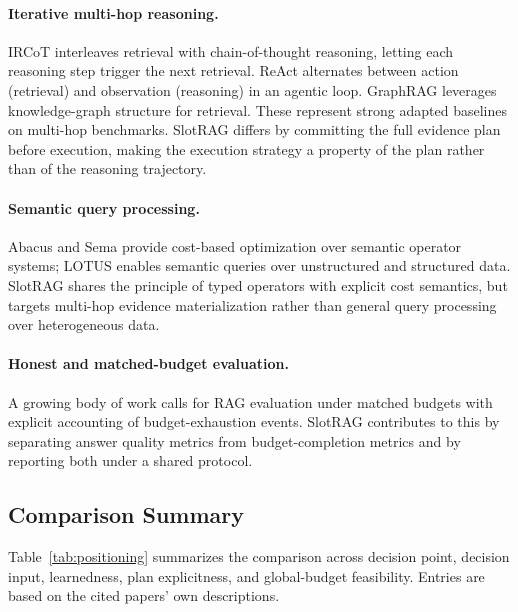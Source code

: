 \paragraph{Iterative multi-hop reasoning.}
IRCoT \cite{ircot} interleaves retrieval with chain-of-thought reasoning, letting each reasoning step trigger the next retrieval. ReAct \cite{react} alternates between action (retrieval) and observation (reasoning) in an agentic loop. GraphRAG \cite{graphrag} leverages knowledge-graph structure for retrieval. These represent strong adapted baselines on multi-hop benchmarks. SlotRAG differs by committing the full evidence plan before execution, making the execution strategy a property of the plan rather than of the reasoning trajectory.

\paragraph{Semantic query processing.}
Abacus and Sema \cite{sema} provide cost-based optimization over semantic operator systems; LOTUS \cite{lotus} enables semantic queries over unstructured and structured data. SlotRAG shares the principle of typed operators with explicit cost semantics, but targets multi-hop evidence materialization rather than general query processing over heterogeneous data.

\paragraph{Honest and matched-budget evaluation.}
A growing body of work calls for RAG evaluation under matched budgets with explicit accounting of budget-exhaustion events. SlotRAG contributes to this by separating answer quality metrics from budget-completion metrics and by reporting both under a shared protocol.

\subsection{Comparison Summary}
\label{sec:related:table}

Table~\ref{tab:positioning} summarizes the comparison across decision point, decision input, learnedness, plan explicitness, and global-budget feasibility. Entries are based on the cited papers' own descriptions.

